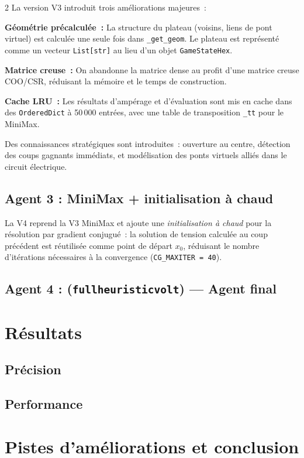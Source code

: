 \documentclass[11pt]{article}
\begin{document}
\begin{multicols}{2}
La version V3 introduit trois améliorations majeures~:

\textbf{Géométrie précalculée~:} La structure du plateau (voisins, liens de pont virtuel) est calculée une seule fois dans \texttt{\_get\_geom}. Le plateau est représenté comme un vecteur \texttt{List[str]} au lieu d'un objet \texttt{GameStateHex}.

\textbf{Matrice creuse~:} On abandonne la matrice dense au profit d'une matrice creuse COO/CSR, réduisant la mémoire et le temps de construction.

\textbf{Cache LRU~:} Les résultats d'ampérage et d'évaluation sont mis en cache dans des \texttt{OrderedDict} à 50\,000 entrées, avec une table de transposition \texttt{\_tt} pour le MiniMax.

Des connaissances stratégiques sont introduites~: ouverture au centre, détection des coups gagnants immédiats, et modélisation des ponts virtuels alliés dans le circuit électrique.

\subsection{Agent 3 : MiniMax + initialisation à chaud}

La V4 reprend la V3 MiniMax et ajoute une \textit{initialisation à chaud} pour la résolution par gradient conjugué~: la solution de tension calculée au coup précédent est réutilisée comme point de départ $x_0$, réduisant le nombre d'itérations nécessaires à la convergence (\texttt{CG\_MAXITER = 40}).

\subsection{Agent 4 : (\texttt{fullheuristicvolt}) — Agent final}



\section{Résultats}

\subsection{Précision}

\subsection{Performance}

\section{Pistes d'améliorations et conclusion}



\end{multicols}

\newpage
\printbibliography
\end{document}
